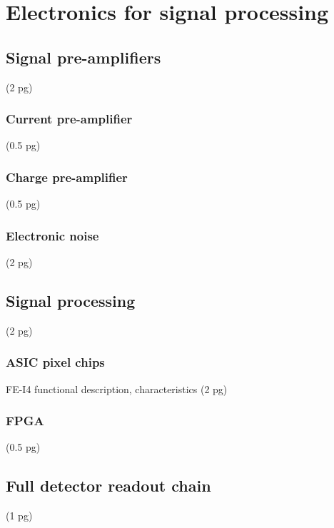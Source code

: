 \documentclass[11pt]{mytustyle}  %
\begin{document}
\section{Electronics for signal processing}
\subsection{Signal pre-amplifiers}
(2 pg)
\subsubsection{Current pre-amplifier}
(0.5 pg)
\subsubsection{Charge pre-amplifier}
(0.5 pg)
\subsubsection{Electronic noise}
(2 pg)


\subsection{Signal processing}
(2 pg)
\subsubsection{ASIC pixel chips}
FE-I4 functional description, characteristics
 (2 pg)
\subsubsection{FPGA}
(0.5 pg)
\subsection{Full detector readout chain}
(1 pg)


\end{document}
